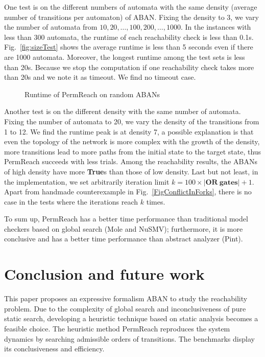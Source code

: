 \documentclass{article}
\theoremstyle{definition}
\begin{document}
One test is on the different numbers of automata with the same density (average number of transitions per automaton) of ABAN. Fixing the density to 3, we vary the number of automata from $10,20,\ldots,100,200,\ldots,1000$.
In the instances with less than 300 automata, the runtime of each reachability check is less than 0.1s.
Fig.~\ref{fig:sizeTest} shows the average runtime is less than 5 seconds even if there are 1000 automata. 
Moreover, the longest runtime among the test sets is less than 20s. 
Because we stop the computation if one reachability check takes more than 20s and we note it as timeout.
We find no timeout case.
\begin{figure}[ht]
    \caption{Runtime of PermReach on random ABANs}
\end{figure}
Another test is on the different density with the same number of automata. 
Fixing the number of automata to 20, we vary the density of the transitions from 1 to 12.
We find the runtime peak is at density 7, a possible explanation is that even the topology of the network is more complex with the growth of the density, more transitions lead to more paths from the initial state to the target state, thus PermReach succeeds with less trials.
Among the reachability results, the ABANs of high density have more \textbf{True}s than those of low density.
Last but not least, in the implementation, we set arbitrarily iteration limit $k=100\times|\mathbf{OR\  gates}|+1$. 
Apart from handmade counterexample in Fig.~\ref{FigConflictInForks}, there is no case in the tests where the iterations reach $k$ times.


To sum up, PermReach has a better time performance than traditional model checkers based on global search (Mole and NuSMV); furthermore, it is more conclusive and has a better time performance than abstract analyzer (Pint).

\section{Conclusion and future work}\label{sect:6}
This paper proposes an expressive formalism ABAN to study the reachability problem. 
Due to the complexity of global search and inconclusiveness of pure static search, developing a heuristic technique based on static analysis becomes a feasible choice.
The heuristic method PermReach reproduces the system dynamics by searching admissible orders of transitions.
The benchmarks display its conclusiveness and efficiency.
\end{document}
